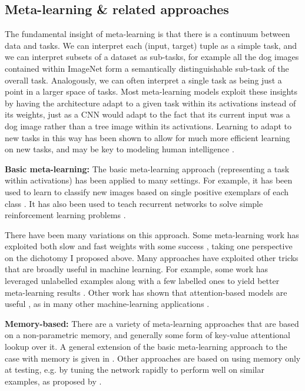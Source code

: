\subsection{Meta-learning \& related approaches} \label{meta_learning_sec}

The fundamental insight of meta-learning is that there is a continuum between data and tasks. We can interpret each (input, target) tuple as a simple task, and we can interpret subsets of a dataset as sub-tasks, for example all the dog images contained within ImageNet form a semantically distinguishable sub-task of the overall task. Analogously, we can often interpret a single task as being just a point in a larger space of tasks. Most meta-learning models exploit these insights by having the architecture adapt to a given task within its activations instead of its weights, just as a CNN would adapt to the fact that its current input was a dog image rather than a tree image within its activations. Learning to adapt to new tasks in this way has been shown to allow for much more efficient learning on new tasks, and may be key to modeling human intelligence \citep{Hansen2017}. \par 
\textbf{Basic meta-learning:}
The basic meta-learning approach (representing a task within activations) has been applied to many settings. For example, it has been used to learn to classify new images based on single positive exemplars of each class \citep{Vinyals2016}. It has also been used to teach recurrent networks to solve simple reinforcement learning problems \citep{Duan2016, Wang2016a, Stadie2018}. \par
There have been many variations on this approach. Some meta-learning work has exploited both slow and fast weights with some success \citep[e.g.][]{Munkhdalai2017}, taking one perspective on the dichotomy I proposed above. Many approaches have exploited other tricks that are broadly useful in machine learning. For example, some work has leveraged unlabelled examples along with a few labelled ones to yield better meta-learning results \citep[e.g.][]{Ren2018}. Other work has shown that attention-based models are useful \citep{Reed2017}, as in many other machine-learning applications \citep[e.g.][]{Vaswani, Gregor2015}. \par
\textbf{Memory-based:} There are a variety of meta-learning approaches that are based on a non-parametric memory, and generally some form of key-value attentional lookup over it. A general extension of the basic meta-learning approach to the case with memory is given in \citet{Santoro2016}. Other approaches are based on using memory only at testing, e.g. by tuning the network rapidly to perform well on similar examples, as proposed by \citet{Sprechmann2018}. \par 
